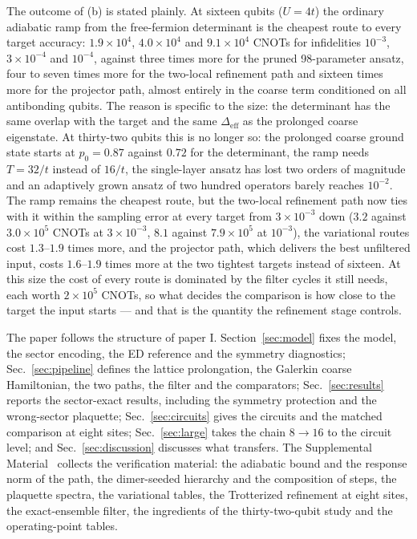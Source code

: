 \documentclass[a4paper,11pt,noarxiv]{quantumarticle}
\newcommand{\Deff}{\Delta_{\mathrm{eff}}}
\newcommand{\SM}{Supplemental Material~\cite{SM}}
\begin{document}
The outcome of (b) is stated plainly.  At sixteen qubits ($U=4t$) the
ordinary adiabatic ramp from the free-fermion determinant is the cheapest
route to every target accuracy: $1.9\times10^4$, $4.0\times10^4$ and
$9.1\times10^4$ CNOTs for infidelities $10^{-3}$, $3\times10^{-4}$ and
$10^{-4}$, against three times more for the pruned 98-parameter ansatz,
four to seven times more for the two-local refinement path and sixteen
times more for the projector path, almost entirely in the coarse term
conditioned on all antibonding qubits.  The reason is specific to the size:
the determinant has the same overlap with the target and the same $\Deff$
as the prolonged coarse eigenstate.  At thirty-two qubits this is no longer
so: the prolonged coarse ground state starts at $p_0=0.87$ against $0.72$
for the determinant, the ramp needs $T=32/t$ instead of $16/t$, the
single-layer ansatz has lost two orders of magnitude and an adaptively
grown ansatz of two hundred operators barely reaches $10^{-2}$.  The ramp
remains the cheapest route, but the two-local refinement path now ties with
it within the sampling error at every target from $3\times10^{-3}$ down
($3.2$ against $3.0\times10^5$ CNOTs at $3\times10^{-3}$, $8.1$ against
$7.9\times10^5$ at $10^{-3}$), the variational routes cost $1.3$--$1.9$
times more, and the
projector path, which delivers the best unfiltered input, costs $1.6$--$1.9$
times more at the two tightest targets instead of sixteen.  At this size
the cost of every route is dominated by the filter cycles it still needs,
each worth $2\times10^5$ CNOTs, so what decides the comparison is how close
to the target the input starts --- and that is the quantity the refinement
stage controls.

The paper follows the structure of paper I.  Section~\ref{sec:model} fixes
the model, the sector encoding, the ED reference and the symmetry
diagnostics; Sec.~\ref{sec:pipeline} defines the lattice prolongation, the
Galerkin coarse Hamiltonian, the two paths, the filter and the comparators;
Sec.~\ref{sec:results} reports the sector-exact results, including the
symmetry protection and the wrong-sector plaquette; Sec.~\ref{sec:circuits}
gives the circuits and the matched comparison at eight sites;
Sec.~\ref{sec:large} takes the chain $8\to16$ to the circuit level; and
Sec.~\ref{sec:discussion} discusses what transfers.  The \SM{} collects the
verification material: the adiabatic bound and the response norm of the
path, the dimer-seeded hierarchy and the composition of steps, the plaquette
spectra, the variational tables, the Trotterized refinement at eight sites,
the exact-ensemble filter, the ingredients of the thirty-two-qubit study and
the operating-point tables.
\end{document}
